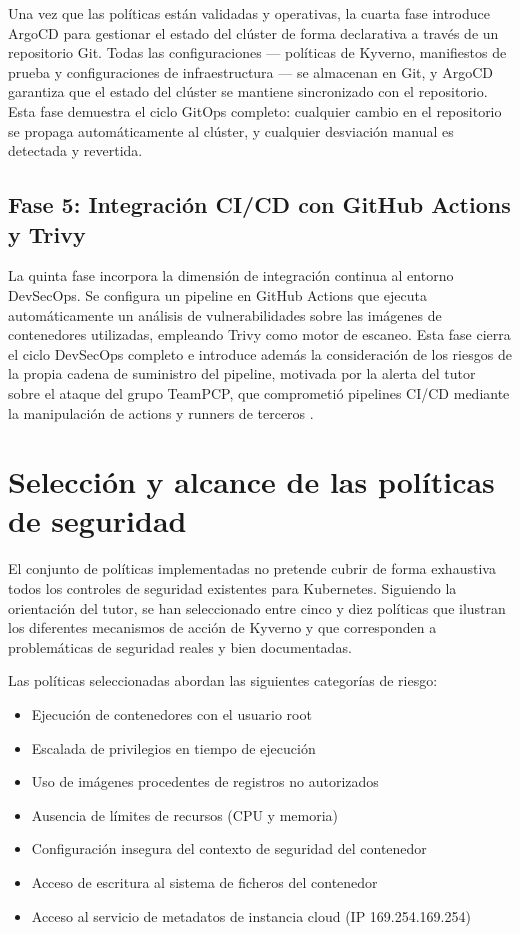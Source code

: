 Una vez que las políticas están validadas y operativas, la cuarta fase introduce ArgoCD para gestionar el estado del clúster de forma declarativa a través de un repositorio Git. Todas las configuraciones — políticas de Kyverno, manifiestos de prueba y configuraciones de infraestructura — se almacenan en Git, y ArgoCD garantiza que el estado del clúster se mantiene sincronizado con el repositorio. Esta fase demuestra el ciclo GitOps completo: cualquier cambio en el repositorio se propaga automáticamente al clúster, y cualquier desviación manual es detectada y revertida.

\subsection{Fase 5: Integración CI/CD con GitHub Actions y Trivy}

La quinta fase incorpora la dimensión de integración continua al entorno DevSecOps. Se configura un pipeline en GitHub Actions que ejecuta automáticamente un análisis de vulnerabilidades sobre las imágenes de contenedores utilizadas, empleando Trivy como motor de escaneo. Esta fase cierra el ciclo DevSecOps completo e introduce además la consideración de los riesgos de la propia cadena de suministro del pipeline, motivada por la alerta del tutor sobre el ataque del grupo TeamPCP, que comprometió pipelines CI/CD mediante la manipulación de actions y runners de terceros \cite{teampcp2026}.

\section{Selección y alcance de las políticas de seguridad}

El conjunto de políticas implementadas no pretende cubrir de forma exhaustiva todos los controles de seguridad existentes para Kubernetes. Siguiendo la orientación del tutor, se han seleccionado entre cinco y diez políticas que ilustran los diferentes mecanismos de acción de Kyverno y que corresponden a problemáticas de seguridad reales y bien documentadas.

Las políticas seleccionadas abordan las siguientes categorías de riesgo:

\begin{itemize}
    \item Ejecución de contenedores con el usuario root
    \item Escalada de privilegios en tiempo de ejecución
    \item Uso de imágenes procedentes de registros no autorizados
    \item Ausencia de límites de recursos (CPU y memoria)
    \item Configuración insegura del contexto de seguridad del contenedor
    \item Acceso de escritura al sistema de ficheros del contenedor
    \item Acceso al servicio de metadatos de instancia cloud (IP 169.254.169.254)
\end{itemize}

